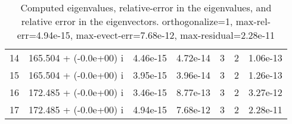 \begin{table}[H]
\begin{center}
\begin{tabular}{|c|c|c|c|c|c|c|}
    14  &    165.504 + (-0.0e+00) i  &    4.46e-15      &   4.72e-14    &   3    &  2   &    1.06e-13 \\
    15  &    165.504 + (-0.0e+00) i  &    3.95e-15      &   3.96e-14    &   3    &  2   &    1.26e-13 \\
    16  &    172.485 + (-0.0e+00) i  &    3.46e-15      &   8.77e-13    &   3    &  2   &    3.27e-12 \\
    17  &    172.485 + (-0.0e+00) i  &    4.94e-15      &   7.68e-12    &   3    &  2   &    2.28e-11 \\
\hline
\end{tabular}
\caption{Computed eigenvalues, relative-error in the eigenvalues, and relative error in the eigenvectors. orthogonalize=1, max-rel-err=4.94e-15, max-evect-err=7.68e-12, max-residual=2.28e-11
}\label{table:genEigsbox2.order2.hdf}
\end{center}
\end{table}
